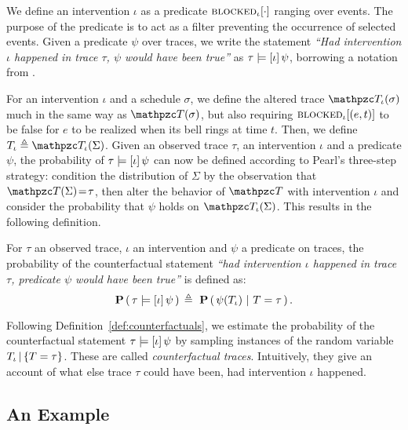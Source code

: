We define an intervention $\iota$ as a predicate
${\textsc{blocked}}_{\iota}[\cdot]$ ranging over events. The purpose of the
predicate is to act as a filter preventing the occurrence of selected
events. Given a predicate $\psi$ over traces, we write the statement
\textit{``Had intervention $\iota$ happened in trace $\tau$, $\psi$
  would have been true''} as $\tau \models [\iota] \, \psi{}$, borrowing a notation from
\cite{halpern2016actual}.

For an intervention $\iota$ and a schedule $\sigma$, we define the
altered trace $\DetTrace_\iota(\sigma)$ much in the same way as
$\DetTrace(\sigma)$, but also requiring ${\textsc{blocked}}_{\iota}[(e, t)]$ to
be false for $e$ to be realized when its bell rings at time $t$.
Then, we define $T_\iota \eqdef \DetTrace_\iota(\Sigma)$.  Given an
observed trace $\tau$, an intervention $\iota$ and a predicate $\psi$,
the probability of $\tau \models [\iota] \, \psi{}$ can now be defined according to Pearl's
three-step strategy: \ItAbduction{} condition the distribution of
$\Sigma$ by the observation that $\DetTrace(\Sigma)\!=\!\tau$, then
\ItAction{} alter the behavior of $\DetTrace$ with intervention
$\iota$ and \ItPrediction{} consider the probability that $\psi$ holds
on $\DetTrace_\iota(\Sigma)$. This results in the following
definition.

\begin{definition}
  \label{def:counterfactuals}
  For $\tau$ an observed trace, $\iota$ an intervention and $\psi$ a
  predicate on traces, the probability of the counterfactual statement
  \textit{``had intervention $\iota$ happened in trace $\tau$,
    predicate $\psi$ would have been true''} is defined as:
  \[ \mathbf{P} \left(\, \tau \models [\iota] \, \psi{} \,\right){} \triangleq \ \mathbf{P} \left(\, \psi({T_\iota}{}) \,\, | \,\, T =
      \tau \,\right). \]
\end{definition}

Following Definition~\ref{def:counterfactuals}, we estimate the
probability of the counterfactual statement $\tau \models [\iota] \, \psi{}$ by sampling
instances of the random variable ${T_\iota\,|\,\{T=\tau\}}{}$. 
These are called \emph{counterfactual traces}. Intuitively,
they give an account of what else trace $\tau$ could have been, had
intervention $\iota$ happened.


\subsection{An Example}\label{subsec:counterfactuals-example}



